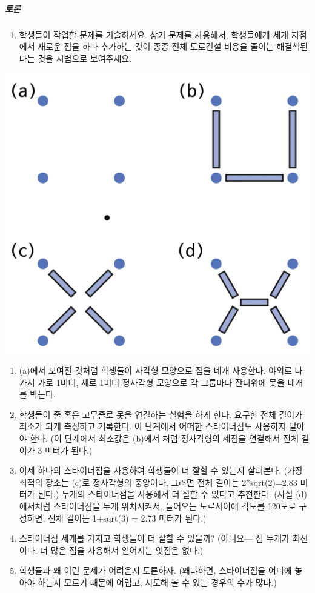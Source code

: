 \documentclass[]{article}
\begin{document}
\subparagraph{토론}\label{section-216}

\begin{enumerate}
\itemsep1pt\parskip0pt
\item
  학생들이 작업할 문제를 기술하세요. 상기 문제를 사용해서, 학생들에게
  세개 지점에서 새로운 점을 하나 추가하는 것이 종종 전체 도로건설 비용을
  줄이는 해결책된다는 것을 시범으로 보여주세요.
\end{enumerate}

\includegraphics{csunplugged/04-part/img/ch16-steiner/15-steiner-03-four-sites.png}

\begin{enumerate}
\item
  (a)에서 보여진 것처럼 학생들이 사각형 모양으로 점을 네개 사용한다.
  야외로 나가서 가로 1미터, 세로 1미터 정사각형 모양으로 각 그룹마다
  잔디위에 못을 네개를 박는다.
\item
  학생들이 줄 혹은 고무줄로 못을 연결하는 실험을 하게 한다. 요구한 전체
  길이가 최소가 되게 측정하고 기록한다. 이 단계에서 어떠한 스타이너점도
  사용하지 말아야 한다. (이 단계에서 최소값은 (b)에서 처럼 정사각형의
  세점을 연결해서 전체 길이가 3 미터가 된다.)
\item
  이제 하나의 스타이너점을 사용하여 학생들이 더 잘할 수 있는지 살펴본다.
  (가장 최적의 장소는 (c)로 정사각형의 중앙이다, 그러면 전체 길이는
  2*sqrt(2)=2.83 미터가 된다.) 두개의 스타이너점을 사용해서 더 잘할 수
  있다고 추천한다. (사실 (d)에서처럼 스타이너점을 두개 위치시켜서,
  들어오는 도로사이에 각도를 120도로 구성하면, 전체 길이는 1+sqrt(3) =
  2.73 미터가 된다.)
\item
  스타이너점 세개를 가지고 학생들이 더 잘할 수 있을까? (아니요--- 점
  두개가 최선이다. 더 많은 점을 사용해서 얻어지는 잇점은 없다.)
\item
  학생들과 왜 이런 문제가 어려운지 토론하자. (왜냐하면, 스타이너점을
  어디에 놓아야 하는지 모르기 때문에 어렵고, 시도해 볼 수 있는 경우의
  수가 많다.)
\end{enumerate}
\end{document}

